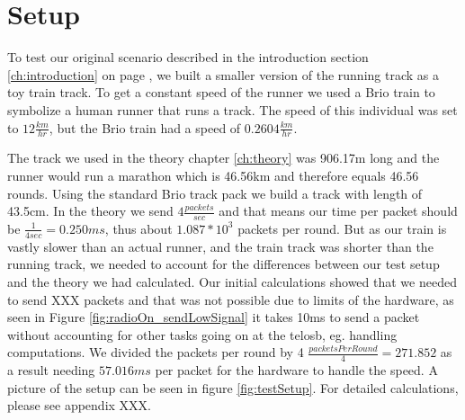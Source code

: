 \section{Setup}\label{sc:setup}

To test our original scenario described in the introduction section \ref{ch:introduction} on page \pageref{ch:introduction}, we built a smaller version of the running track as a toy train track. To get a constant speed of the runner we used a Brio train to symbolize a human runner that runs a track. The speed of this individual was set to $12\frac{km}{hr}$, but the Brio train had a speed of $0.2604\frac{km}{hr}$.

\noindent The track we used in the theory chapter \ref{ch:theory} was 906.17m long and the runner would run a marathon which is 46.56km and therefore equals 46.56 rounds. Using the standard Brio track pack we build a track with length of 43.5cm. In the theory we send $4\frac{packets}{sec}$ and that means our time per packet should be $\frac{1}{4sec} = 0.250ms$, thus about $1.087*10^3$ packets per round. But as our train is vastly slower than an actual runner, and the train track was shorter than the running track, we needed to account for the differences between our test setup and the theory we had calculated. Our initial calculations showed that we needed to send XXX packets and that was not possible due to limits of the hardware, as seen in Figure \ref{fig:radioOn_sendLowSignal} it takes 10ms to send a packet without accounting for other tasks going on at the telosb, eg. handling computations. We divided the packets per round by 4 $ \frac{packetsPerRound}{4} = 271.852 $ as a result needing $57.016 ms$ per packet for the hardware to handle the speed. A picture of the setup can be seen in figure \ref{fig:testSetup}. For detailed calculations, please see appendix XXX.
